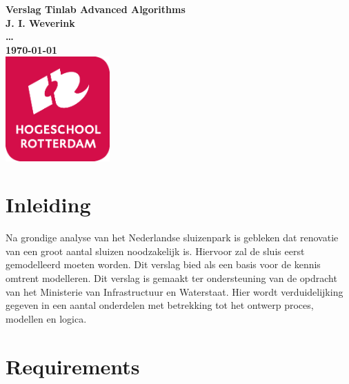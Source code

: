 \documentclass{article}%
\begin{document}
\sffamily
\begin{titlepage}
  \centering
    \vfill
    {\bfseries\Huge
      Verslag Tinlab Advanced Algorithms \\
        \vskip2cm
      }
      {\bfseries\Large
        J. I. Weverink\\
      }
      {
        \bfseries\normalsize
        \ldots\\
        \vskip1cm
        \today\\
    }    
    \vfill
    \includegraphics[width=4cm]{pictures/logohr.png} %
    \vfill
    \vfill
\end{titlepage}




\clearpage %




\tableofcontents




\clearpage %




\section{Inleiding}
Na grondige analyse van het Nederlandse sluizenpark is gebleken dat renovatie van een groot aantal sluizen noodzakelijk is. Hiervoor zal de sluis eerst gemodelleerd moeten worden. Dit verslag bied als een basis voor de kennis omtrent modelleren.
Dit verslag is gemaakt ter ondersteuning van de opdracht van het Ministerie van Infrastructuur en Waterstaat. Hier wordt verduidelijking gegeven in een aantal onderdelen met betrekking tot het ontwerp proces, modellen en logica.





\clearpage %




\section{Requirements}
\end{document}
